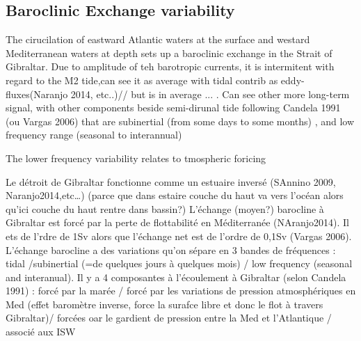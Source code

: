 


\subsection{Baroclinic Exchange variability}

The cirucilation of eastward Atlantic waters at the surface and westard Mediterranean waters at depth sets up a baroclinic exchange in the Strait of Gibraltar. Due to amplitude of teh barotropic currents, it is intermitent with regard to the M2 tide,can see it as average with tidal contrib as eddy-fluxes(Naranjo 2014, etc..)//  but is in average ... .  Can see other more long-term signal, with other components beside semi-dirunal tide following Candela 1991 (ou Vargas 2006) that are subinertial (from some days to some months) , and low frequency range (seasonal to interannual)

The lower frequency variability relates to tmospheric foricing




Le détroit de Gibraltar fonctionne comme un estuaire inversé (SAnnino 2009, Naranjo2014,etc…) (parce que dans estaire couche du haut va vers l’océan alors qu’ici couche du haut rentre dans bassin?)
L’échange (moyen?) barocline à Gibraltar est forcé par la perte de flottabilité en Méditerranée (NAranjo2014). Il ets de l’rdre de 1Sv alors que l’échange net est de l’ordre de 0,1Sv (Vargas 2006). L’échange barocline a des variations qu’on sépare en 3 bandes de fréquences : tidal /subinertial (=de quelques jours à quelques mois) / low frequency (seasonal and interanual).
Il y a 4 composantes à l’écoulement à Gibraltar (selon Candela 1991) : forcé par la marée / forcé par les variations de pression atmosphériques en Med (effet baromètre inverse, force la surafce libre et donc le flot à travers Gibraltar)/ forcées oar le gardient de pression entre la Med et l’Atlantique / associé aux ISW\\



